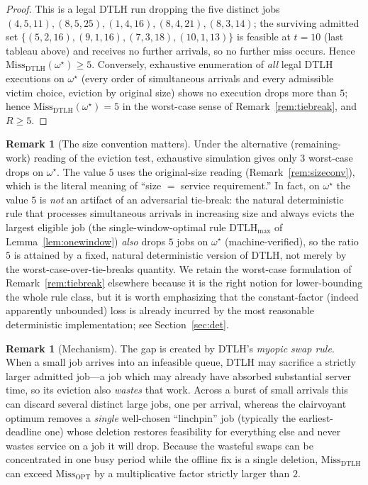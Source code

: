 \documentclass{amsart}
\theoremstyle{definition}
\newtheorem{remark}[theorem]{Remark}
\begin{document}
\begin{proof}
\smallskip
This is a legal DTLH run dropping the five distinct jobs
$(4,5,11),(8,5,25),(1,4,16),(8,4,21),(8,3,14)$; the surviving admitted set
$\{(5,2,16),(9,1,16),(7,3,18),(10,1,13)\}$ is feasible at $t=10$ (last tableau
above) and receives no further arrivals, so no further miss occurs. Hence
$\mathrm{Miss}_{\mathrm{DTLH}}(\omega^\star)\ge 5$. Conversely, exhaustive
enumeration of \emph{all} legal DTLH executions on $\omega^\star$ (every order of
simultaneous arrivals and every admissible victim choice, eviction by original
size) shows no execution drops more than $5$; hence
$\mathrm{Miss}_{\mathrm{DTLH}}(\omega^\star)=5$ in the worst-case sense of
Remark~\ref{rem:tiebreak}, and $R\ge 5$.
\end{proof}

\begin{remark}[The size convention matters]
Under the alternative (remaining-work) reading of the eviction test, exhaustive
simulation gives only $3$ worst-case drops on $\omega^\star$. The value $5$ uses
the original-size reading (Remark~\ref{rem:sizeconv}), which is the literal
meaning of ``size $=$ service requirement.'' In fact, on $\omega^\star$ the value $5$ is \emph{not} an artifact of an
adversarial tie-break: the natural deterministic rule that processes simultaneous
arrivals in increasing size and always evicts the largest eligible job (the
single-window-optimal rule $\mathrm{DTLH}_{\max}$ of
Lemma~\ref{lem:onewindow}) \emph{also} drops $5$ jobs on $\omega^\star$
(machine-verified), so the ratio $5$ is attained by a fixed, natural
deterministic version of DTLH, not merely by the worst-case-over-tie-breaks
quantity. We retain the worst-case formulation of Remark~\ref{rem:tiebreak}
elsewhere because it is the right notion for lower-bounding the whole rule class,
but it is worth emphasizing that the constant-factor (indeed apparently
unbounded) loss is already incurred by the most reasonable deterministic
implementation; see Section~\ref{sec:det}.
\end{remark}

\begin{remark}[Mechanism]
The gap is created by DTLH's \emph{myopic swap rule}. When a small job arrives
into an infeasible queue, DTLH may sacrifice a strictly larger admitted job---a
job which may already have absorbed substantial server time, so its eviction also
\emph{wastes} that work. Across a burst of small arrivals this can discard
several distinct large jobs, one per arrival, whereas the clairvoyant optimum
removes a \emph{single} well-chosen ``linchpin'' job (typically the
earliest-deadline one) whose deletion restores feasibility for everything else
and never wastes service on a job it will drop. Because the wasteful swaps can be
concentrated in one busy period while the offline fix is a single deletion,
$\mathrm{Miss}_{\mathrm{DTLH}}$ can exceed $\mathrm{Miss}_{\mathrm{OPT}}$ by a
multiplicative factor strictly larger than $2$.
\end{remark}
\end{document}
